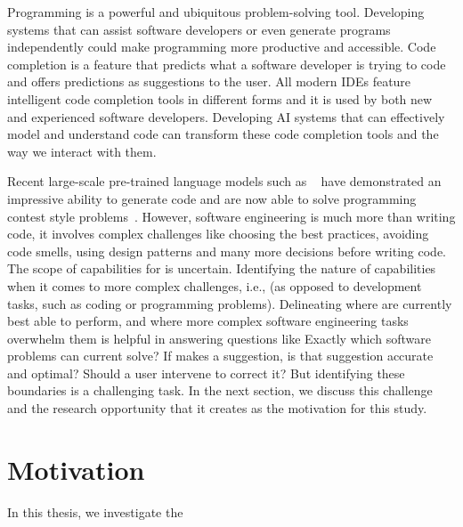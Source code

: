 \label{chapter:introduction}
Programming is a powerful and ubiquitous problem-solving tool. Developing systems that can assist software developers or even generate programs independently could make programming more productive and accessible. 
Code completion is a feature that predicts what a software developer is trying to code and offers predictions as suggestions to the user. All modern IDEs feature intelligent code completion tools in different forms and it is used by both new and experienced software developers. Developing AI systems that can effectively model and understand code can transform these code completion tools and the way we interact with them.

Recent large-scale pre-trained language models such as \cop{}~\cite{Copilot-web} have demonstrated an impressive ability to generate code and are now able to solve programming contest style problems~\cite{empirical_eval}. 
However, software engineering is much more than writing code, it involves complex challenges like choosing the best practices, avoiding code smells, using design patterns and many more decisions before writing code. 
The scope of capabilities for \cct{} is uncertain. Identifying the nature of \cop{} capabilities when it comes to more complex challenges, i.e., \AISE{} (as opposed to development tasks, such as coding or programming problems). Delineating where \cct{} are currently best able to perform, and where more complex software engineering tasks overwhelm them is helpful in answering questions like 
Exactly which software problems can current \cct{} solve? 
If \cct{} makes a suggestion, is that suggestion accurate and optimal? Should a user intervene to correct it? But identifying these boundaries is a challenging task. In the next section, we discuss this challenge and the research opportunity that it creates as the motivation for this study.

\section{Motivation}


In this thesis, we investigate the




